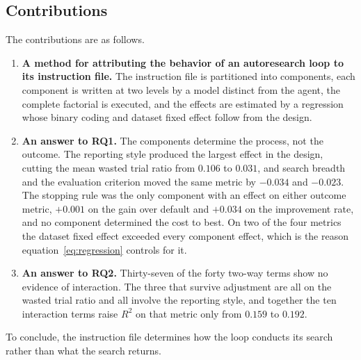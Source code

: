 \documentclass[11pt]{article}
\begin{document}
\subsection{Contributions}

The contributions are as follows.

\begin{enumerate}
\item \textbf{A method for attributing the behavior of an autoresearch loop to its instruction file.} The instruction file is partitioned into components, each component is written at two levels by a model distinct from the agent, the complete factorial is executed, and the effects are estimated by a regression whose binary coding and dataset fixed effect follow from the design. 
\item \textbf{An answer to RQ1.} The components determine the process, not the outcome. The reporting style produced the largest effect in the design, cutting the mean wasted trial ratio from $0.106$ to $0.031$, and search breadth and the evaluation criterion moved the same metric by $-0.034$ and $-0.023$.  The stopping rule was the only component with an effect on either outcome metric, $+0.001$ on the gain over default and $+0.034$ on the improvement rate, and no component determined the cost to best. On two of the four metrics the dataset fixed effect exceeded every component effect, which is the reason equation~\eqref{eq:regression} controls for it.
\item \textbf{An answer to RQ2.} Thirty-seven of the forty two-way terms show no evidence of interaction. The three that survive adjustment are all on the wasted trial ratio and all involve the reporting style, and together the ten interaction terms raise $R^2$ on that metric only from $0.159$ to $0.192$.\end{enumerate}

To conclude, the instruction file determines how the loop conducts its search rather than what the search returns.
\end{document}
